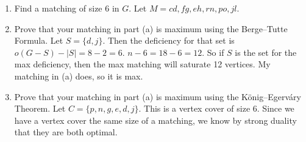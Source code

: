 \documentclass[12pt]{article}
\begin{document}
\begin{enumerate}
\begin{center}
\end{center}
\begin{enumerate}
\item Find a matching of size $6$ in $G$.\m
Let $M = {cd,fg,eh,rn,po,jl}$.
\item Prove that your matching in part (a) is maximum using the Berge--Tutte Formula.\m
Let $S = \{d,j\}$. Then the deficiency for that set is $o(G-S)-|S| = 8-2 = 6$. $n-6 = 18-6=12$. So if $S$ is the set for the max deficiency, then the max matching will saturate 12 vertices. My matching in (a) does, so it is max.
\item Prove that your matching in part (a) is maximum using the K\"onig--Egerv\'ary Theorem.\m
Let $C = \{p,n,g,e,d,j\}$. This is a vertex cover of size 6. Since we have a vertex cover the same size of a matching, we know by strong duality that they are both optimal.
\end{enumerate}
\end{enumerate}
\end{document}
